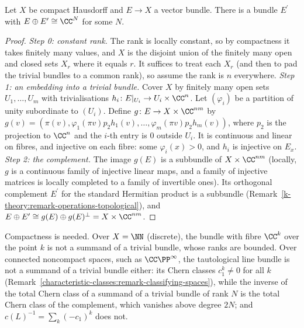 \begin{lemma}\label{k-theory:lemma-direct-summand}
Let $X$ be compact Hausdorff and $E \to X$ a vector bundle. There is a bundle $E^{\prime}$ with $E \oplus E^{\prime} \cong \CC^N$ for some $N$.
\end{lemma}

\begin{proof}
\emph{Step 0: constant rank.} The rank is locally constant, so by compactness it takes finitely many values, and $X$ is the disjoint union of the finitely many open and closed sets $X_r$ where it equals $r$.
It suffices to treat each $X_r$ (and then to pad the trivial bundles to a common rank), so assume the rank is $n$ everywhere.
\emph{Step 1: an embedding into a trivial bundle.} Cover $X$ by finitely many open sets $U_1, \ldots, U_m$ with trivialisations $h_i \colon E|_{U_i} \to U_i \times \CC^{n}$. Let
$(\varphi_i)$ be a partition of unity subordinate to $(U_i)$. Define $g \colon E \to X \times \CC^{nm}$ by $g(v) = (\pi(v), \varphi_1(\pi v)p_2h_1(v), \ldots, \varphi_m(\pi v)p_2h_m(v))$, where $p_2$ is the
projection to $\CC^n$ and the $i$-th entry is $0$ outside $U_i$. It is continuous and linear on fibres, and injective on each fibre: some $\varphi_i(x) > 0$, and $h_i$ is injective on $E_x$.
\emph{Step 2: the complement.} The image $g(E)$ is a subbundle of $X \times \CC^{nm}$ (locally, $g$ is a continuous family of injective linear maps, and a family of injective matrices is locally
completed to a family of invertible ones). Its orthogonal complement $E^{\prime}$ for the standard Hermitian product is a subbundle (Remark~\ref{k-theory:remark-operations-topological}), and
$E \oplus E^{\prime} \cong g(E) \oplus g(E)^\perp = X \times \CC^{nm}$.
\end{proof}

\begin{counterexample}\label{k-theory:counterexample-noncompact}
Compactness is needed. Over $X = \NN$ (discrete), the bundle with fibre $\CC^k$ over the point $k$ is not a summand of a trivial bundle, whose ranks are bounded. Over connected noncompact spaces,
such as $\CC\PP^\infty$, the tautological line bundle is not a summand of a trivial bundle either: its Chern classes $c_1^k \neq 0$ for all $k$ (Remark~\ref{characteristic-classes:remark-classifying-spaces}),
while the inverse of the total Chern class of a summand of a trivial bundle of rank $N$ is the total Chern class of the complement, which vanishes above degree $2N$; and $c(L)^{-1} = \sum_k(-c_1)^k$ does not.
\end{counterexample}

